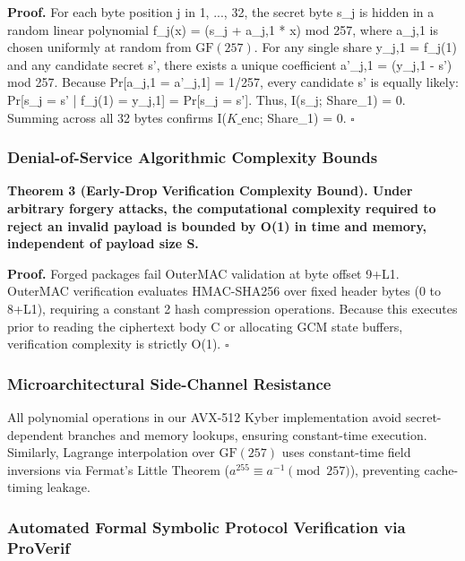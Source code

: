\documentclass[5p,times]{elsarticle}
\newenvironment{proof}{\noindent\textbf{Proof.}}{\hfill$\square$\par\medskip}
\begin{document}
\begin{proof}
For each byte position j in {1, ..., 32}, the secret byte s\_j is hidden in a random linear polynomial f\_j(x) = (s\_j + a\_{j,1} * x) mod 257, where a\_{j,1} is chosen uniformly at random from $\text{GF}(257)$. For any single share y\_{j,1} = f\_j(1) and any candidate secret s', there exists a unique coefficient a'\_{j,1} = (y\_{j,1} - s') mod 257. Because Pr[a\_{j,1} = a'\_{j,1}] = 1/257, every candidate s' is equally likely: Pr[s\_j = s' | f\_j(1) = y\_{j,1}] = Pr[s\_j = s']. Thus, I(s\_j; Share\_1) = 0. Summing across all 32 bytes confirms I($K\_{\text{enc}}$; Share\_1) = 0.
\end{proof}


\subsubsection{Denial-of-Service Algorithmic Complexity Bounds}

\noindent\textbf{\textbf{Theorem 3 (Early-Drop Verification Complexity Bound).} Under arbitrary forgery attacks, the computational complexity required to reject an invalid payload is bounded by O(1) in time and memory, independent of payload size S.}

\begin{proof}
Forged packages fail OuterMAC validation at byte offset 9+L1. OuterMAC verification evaluates HMAC-SHA256 over fixed header bytes (0 to 8+L1), requiring a constant 2 hash compression operations. Because this executes prior to reading the ciphertext body C or allocating GCM state buffers, verification complexity is strictly O(1).
\end{proof}


\subsubsection{Microarchitectural Side-Channel Resistance}

All polynomial operations in our AVX-512 Kyber implementation avoid secret-dependent branches and memory lookups, ensuring constant-time execution. Similarly, Lagrange interpolation over $\text{GF}(257)$ uses constant-time field inversions via Fermat's Little Theorem ($a^{255} \equiv a^{-1} \pmod{257}$), preventing cache-timing leakage.


\subsubsection{Automated Formal Symbolic Protocol Verification via ProVerif}
\end{document}

